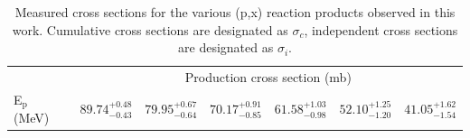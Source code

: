 \begin{table}
\centering
\caption{Measured cross sections for the various (p,x) reaction products observed in this work. Cumulative cross sections are designated as $\sigma_c$, independent cross sections are designated as $\sigma_i$.}
\label{tab:fe_rp_table}
\small
\begin{tabular}{@{}lllllll@{}}
\toprule
                            & \multicolumn{6}{c}{Production cross section (mb)}                                                                                                         \\ \cmidrule(l){2-7} 
E$_\text{p}$ (MeV)          & $89.74^{+0.48}_{-0.43}$ & $79.95^{+0.67}_{-0.64}$ & $70.17^{+0.91}_{-0.85}$ & $61.58^{+1.03}_{-0.98}$ & $52.10^{+1.25}_{-1.20}$ & $41.05^{+1.62}_{-1.54}$ \\ \midrule

\end{tabular}
\end{table}
